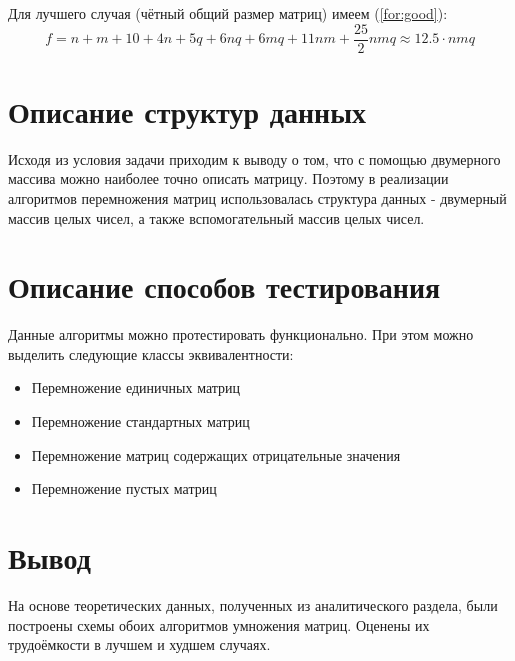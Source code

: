Для лучшего случая (чётный общий размер матриц) имеем (\ref{for:good}):
\begin{equation}
    \label{for:good}
    f = n + m + 10 + 4n + 5q + 6nq + 6mq + 11nm + \frac{25}{2}nmq \approx 12.5 \cdot nmq
\end{equation}


\section{Описание структур данных}
Исходя из условия задачи приходим к выводу о том, что с помощью двумерного массива можно наиболее точно описать матрицу. Поэтому в реализации алгоритмов перемножения матриц использовалась структура данных - двумерный массив целых чисел, а также вспомогательный массив целых чисел. 

\section{Описание способов тестирования}
Данные алгоритмы можно протестировать функционально. При этом можно выделить следующие классы эквивалентности: 

\begin{itemize}
    \item Перемножение единичных матриц
    \item Перемножение стандартных матриц
    \item Перемножение матриц содержащих отрицательные значения
    \item Перемножение пустых матриц
\end{itemize}

\section*{Вывод}

На основе теоретических данных, полученных из аналитического раздела, были построены схемы обоих алгоритмов умножения матриц.  Оценены их трудоёмкости в лучшем и худшем случаях.
